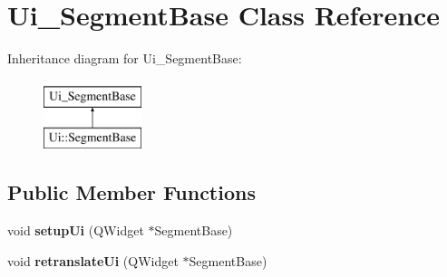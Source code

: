 \hypertarget{class_ui___segment_base}{}\section{Ui\+\_\+\+Segment\+Base Class Reference}
\label{class_ui___segment_base}
Inheritance diagram for Ui\+\_\+\+Segment\+Base\+:\begin{figure}[H]
\begin{center}
\leavevmode
\includegraphics[height=2.000000cm]{class_ui___segment_base}
\end{center}
\end{figure}
\subsection*{Public Member Functions}
\begin{DoxyCompactItemize}
\item 
\mbox{\label{class_ui___segment_base_a411f7d987ad9ee65fe10645728a78361}} 
void {\bfseries setup\+Ui} (Q\+Widget $\ast$Segment\+Base)
\item 
\mbox{\label{class_ui___segment_base_a8d921cddf2ad42fa9bf2258dc16104ac}} 
void {\bfseries retranslate\+Ui} (Q\+Widget $\ast$Segment\+Base)
\end{DoxyCompactItemize}
